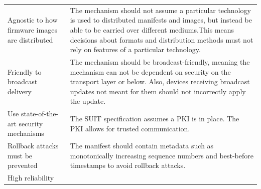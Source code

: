 \documentclass[0-thesis.tex]{subfiles}
\begin{document}
\begin{small}
\begin{longtable}[]{@{}ll@{}}
        \begin{minipage}[t]{0.41\columnwidth}\raggedright\strut
        Agnostic to how firmware images are distributed\strut
        \end{minipage} & \begin{minipage}[t]{0.53\columnwidth}\raggedright\strut
        The mechanism should not assume a particular technology is used to
        distributed manifests and images, but instead be able to be carried over
        different mediums.This means decisions about formats and distribution
        methods must not rely on features of a particular technology.\strut
        \end{minipage}\tabularnewline
        \begin{minipage}[t]{0.41\columnwidth}\raggedright\strut
        Friendly to broadcast delivery\strut
        \end{minipage} & \begin{minipage}[t]{0.53\columnwidth}\raggedright\strut
        The mechanism should be broadcast-friendly, meaning the mechanism can
        not be dependent on security on the transport layer or below. Also,
        devices receiving broadcast updates not meant for them should not
        incorrectly apply the update.\strut
        \end{minipage}\tabularnewline
        \begin{minipage}[t]{0.41\columnwidth}\raggedright\strut
        Use state-of-the-art security mechanisms\strut
        \end{minipage} & \begin{minipage}[t]{0.53\columnwidth}\raggedright\strut
        The SUIT specification assumes a PKI is in place. The PKI allows for
        trusted communication.\strut
        \end{minipage}\tabularnewline
        \begin{minipage}[t]{0.41\columnwidth}\raggedright\strut
        Rollback attacks must be prevented\strut
        \end{minipage} & \begin{minipage}[t]{0.53\columnwidth}\raggedright\strut
        The manifest should contain metadata such as monotonically increasing
        sequence numbers and best-before timestamps to avoid rollback
        attacks.\strut
        \end{minipage}\tabularnewline
        \begin{minipage}[t]{0.41\columnwidth}\raggedright\strut
        High reliability\strut
        \end{minipage} & \begin{minipage}[t]{0.53\columnwidth}\raggedright\strut

\end{minipage}
\end{longtable}
\end{small}
\end{document}
